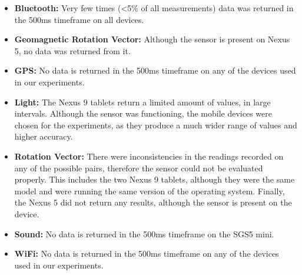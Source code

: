 \documentclass{article}
\begin{document}
\begin{itemize}
	\item \textbf{Bluetooth:} Very few times (<5\% of all measurements) data was returned in the 500ms timeframe on all devices.
    \item \textbf{Geomagnetic Rotation Vector:} Although the sensor is present on Nexus 5, no data was returned from it.
    \item \textbf{GPS:} No data is returned in the 500ms timeframe on any of the devices used in our experiments.
    \item \textbf{Light:} The Nexus 9 tablets return a limited amount of values, in large intervals.
    Although the sensor was functioning, the mobile devices were chosen for the experiments, as they produce a much wider range of values and higher accuracy.
    \item \textbf{Rotation Vector:} There were inconsistencies in the readings recorded on any of the possible pairs, therefore the sensor could not be evaluated properly.  This includes the two Nexus 9 tablets, although they were the same model and were running the same version of the operating system.  Finally, the Nexus 5 did not return any results, although the sensor is present on the device.
    \item \textbf{Sound:} No data is returned in the 500ms timeframe on the SGS5 mini.
    \item \textbf{WiFi:} No data is returned in the 500ms timeframe on any of the devices used in our experiments.
\end{itemize} 
\end{document}
